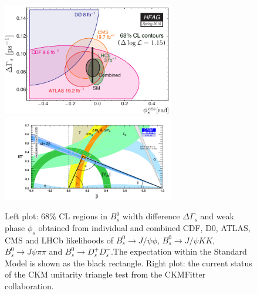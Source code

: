 
\begin{figure}[!htb]
\begin{center}
\includegraphics[width=7.5cm]{hfag_Spring2016_DGsphis_zoom.pdf}
\includegraphics[width=7.5cm]{rhoeta_small_global.pdf}
\end{center}
\caption{Left plot: 68\% CL regions in $B^{0}_{s}$ width difference $\Delta\Gamma_{s}$
and weak phase $\phi_{s}$ obtained from individual and combined CDF, D0,
ATLAS, CMS and LHCb likelihoods of $B^{0}_{s}\to J/\psi\phi$, $B^{0}_{s}\to
J/\psi KK$, $B^{0}_{s}\to J\psi\pi\pi$ and $B^{0}_{s}\to D_{s}^{+}D_{s}^{-}%
$.The expectation within the Standard Model is shown as the black rectangle. Right plot: the current status of the CKM unitarity triangle test from the CKMFitter collaboration. }%
\label{figphis}%
\end{figure}




